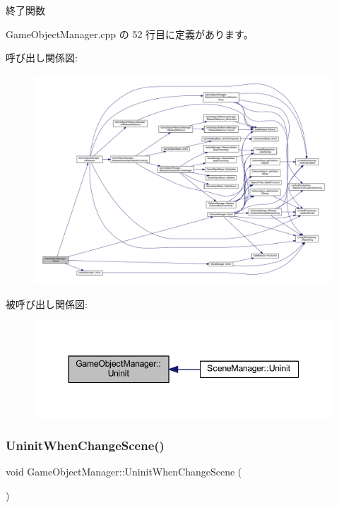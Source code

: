 終了関数 



 Game\+Object\+Manager.\+cpp の 52 行目に定義があります。

呼び出し関係図\+:
\nopagebreak
\begin{figure}[H]
\begin{center}
\leavevmode
\includegraphics[width=350pt]{class_game_object_manager_a4d2cb0e07fddeea160e64f6e1d2a326a_cgraph}
\end{center}
\end{figure}
被呼び出し関係図\+:
\nopagebreak
\begin{figure}[H]
\begin{center}
\leavevmode
\includegraphics[width=344pt]{class_game_object_manager_a4d2cb0e07fddeea160e64f6e1d2a326a_icgraph}
\end{center}
\end{figure}
\mbox{\label{class_game_object_manager_ad962739b2c2f54d4160c3513132930da}} 
\subsubsection{\texorpdfstring{Uninit\+When\+Change\+Scene()}{UninitWhenChangeScene()}}
{\footnotesize\ttfamily void Game\+Object\+Manager\+::\+Uninit\+When\+Change\+Scene (\begin{DoxyParamCaption}{ }\end{DoxyParamCaption})\hspace{0.3cm}{\ttfamily [static]}}



